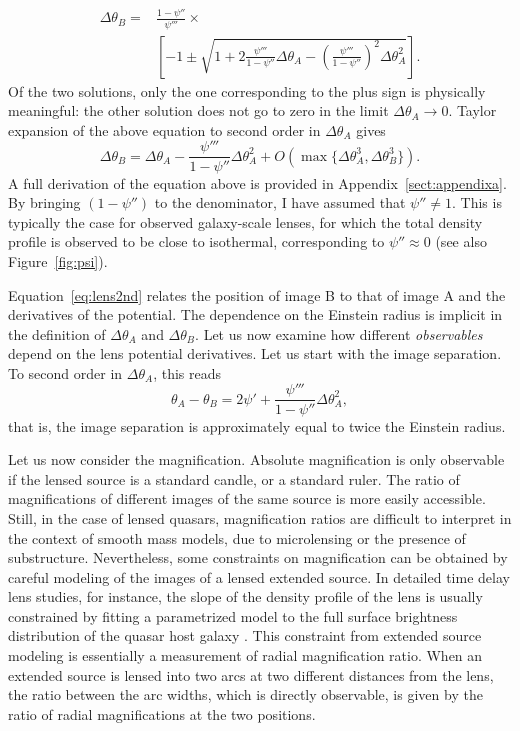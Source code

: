\documentclass[usenatbib]{mnras}
\def\psii{\psi'}
\def\psiii{\psi''}
\def\psiiii{\psi'''}
\def\Fref#1{Figure~\ref{#1}\xspace}
\def\Eref#1{Equation~\ref{#1}\xspace}
\begin{document}
\begin{align}\label{eq:quadratic}
\Delta\theta_B = & \frac{1-\psiii}{\psiiii}\times \nonumber \\
& \left[-1 \pm \sqrt{1 + 2\frac{\psiiii}{1-\psiii}\Delta\theta_A - \left(\frac{\psiiii}{1-\psiii}\right)^2\Delta\theta_A^2}\right].
\end{align}
Of the two solutions, only the one corresponding to the plus sign is physically meaningful: the other solution does not go to zero in the limit $\Delta\theta_A \rightarrow 0$.
Taylor expansion of the above equation to second order in $\Delta\theta_A$ gives
\begin{equation}\label{eq:lens2nd}
\Delta\theta_B = \Delta\theta_A - \frac{\psiiii}{1-\psiii}\Delta\theta_A^2 + O(\max{\{\Delta\theta_A^3, \Delta\theta_B^3\}}).
\end{equation}
A full derivation of the equation above is provided in Appendix~\ref{sect:appendixa}.
By bringing $(1-\psiii)$ to the denominator, I have assumed that $\psiii\neq1$.
This is typically the case for observed galaxy-scale lenses, for which the total density profile is observed to be close to isothermal, corresponding to $\psiii\approx0$ (see also \Fref{fig:psi}).

\Eref{eq:lens2nd} relates the position of image B to that of image A and the derivatives of the potential.
The dependence on the Einstein radius is implicit in the definition of $\Delta\theta_A$ and $\Delta\theta_B$.
Let us now examine how different {\em observables} depend on the lens potential derivatives.
Let us start with the image separation. To second order in $\Delta\theta_A$, this reads
\begin{equation}\label{eq:imsep}
\theta_A - \theta_B = 2\psii + \frac{\psiiii}{1-\psiii}\Delta\theta_A^2,
\end{equation}
that is, the image separation is approximately equal to twice the Einstein radius.

Let us now consider the magnification. Absolute magnification is only observable if the lensed source is a standard candle, or a standard ruler.
The ratio of magnifications of different images of the same source is more easily accessible. Still, in the case of lensed quasars, magnification ratios are difficult to interpret in the context of smooth mass models, due to microlensing or the presence of substructure. 
Nevertheless, some constraints on magnification can be obtained by careful modeling of the images of a lensed extended source.
In detailed time delay lens studies, for instance, the slope of the density profile of the lens is usually constrained by fitting a parametrized model to the full surface brightness distribution of the quasar host galaxy \citep[see e.g.][]{Suy12}. 
This constraint from extended source modeling is essentially a measurement of radial magnification ratio. 
When an extended source is lensed into two arcs at two different distances from the lens, the ratio between the arc widths, which is directly observable, is given by the ratio of radial magnifications at the two positions.
\end{document}
